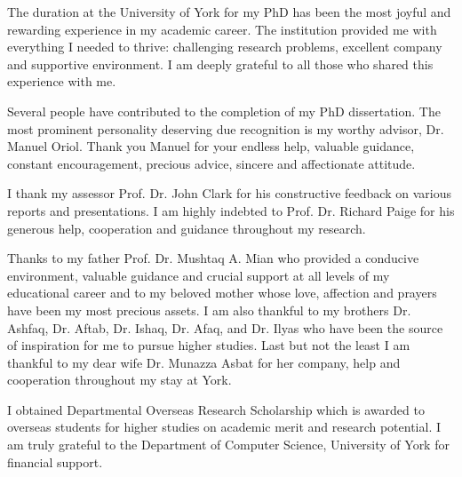 \begin{acknowledgements}
The duration at the University of York for my PhD has been the most joyful and rewarding experience in my academic career. The institution provided me with everything I needed to thrive: challenging research problems, excellent company and supportive environment. I am deeply grateful to all those who shared this experience with me. 

Several people have contributed to the completion of my PhD dissertation. The most prominent personality deserving due recognition is my worthy advisor, Dr. Manuel Oriol. Thank you Manuel for your endless help, valuable guidance, constant encouragement, precious advice, sincere and affectionate attitude.

I thank my assessor Prof. Dr. John Clark for his constructive feedback on various reports and presentations. I am highly indebted to Prof. Dr. Richard Paige for his generous help, cooperation and guidance throughout my research.

Thanks to my father Prof. Dr. Mushtaq A. Mian who provided a conducive environment, valuable guidance and crucial support at all levels of my educational career and to my beloved mother whose love, affection and prayers have been my most precious assets. I am also thankful to my brothers Dr. Ashfaq, Dr. Aftab, Dr. Ishaq, Dr. Afaq, and Dr. Ilyas who have been the source of inspiration for me to pursue higher studies. Last but not the least I am thankful to my dear wife Dr. Munazza Asbat for her company, help and cooperation throughout my stay at York.

I obtained Departmental Overseas Research Scholarship which is awarded to overseas students for higher studies on academic merit and research potential. I am truly grateful to the Department of Computer Science, University of York for financial support. 

\end{acknowledgements}
